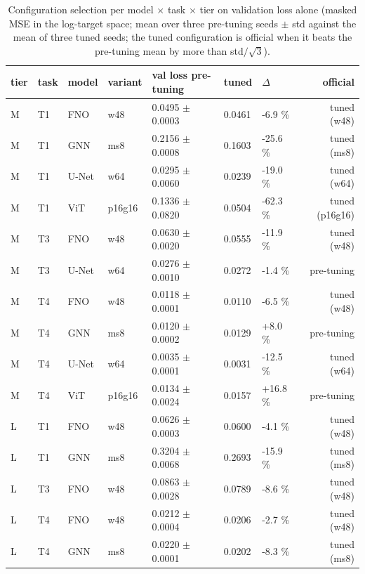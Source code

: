 \begin{table}[tb]
\centering
\scriptsize
\setlength{\tabcolsep}{3.5pt}
\caption{Configuration selection per model $\times$ task $\times$ tier on validation loss alone (masked MSE in the log-target space; mean over three pre-tuning seeds $\pm$ std against the mean of three tuned seeds; the tuned configuration is official when it beats the pre-tuning mean by more than std$/\sqrt{3}$).}
\label{tab:decisions}
\setlength{\tabcolsep}{2.2pt}
\begin{tabular}{lllllllr}
\toprule
tier & task & model & variant & val loss pre-tuning & tuned & $\Delta$ & official \\
\midrule
M & T1 & FNO & w48 & 0.0495 $\pm$ 0.0003 & 0.0461 & -6.9 \% & tuned (w48) \\
M & T1 & GNN & ms8 & 0.2156 $\pm$ 0.0008 & 0.1603 & -25.6 \% & tuned (ms8) \\
M & T1 & U-Net & w64 & 0.0295 $\pm$ 0.0060 & 0.0239 & -19.0 \% & tuned (w64) \\
M & T1 & ViT & p16g16 & 0.1336 $\pm$ 0.0820 & 0.0504 & -62.3 \% & tuned (p16g16) \\
M & T3 & FNO & w48 & 0.0630 $\pm$ 0.0020 & 0.0555 & -11.9 \% & tuned (w48) \\
M & T3 & U-Net & w64 & 0.0276 $\pm$ 0.0010 & 0.0272 & -1.4 \% & pre-tuning \\
M & T4 & FNO & w48 & 0.0118 $\pm$ 0.0001 & 0.0110 & -6.5 \% & tuned (w48) \\
M & T4 & GNN & ms8 & 0.0120 $\pm$ 0.0002 & 0.0129 & +8.0 \% & pre-tuning \\
M & T4 & U-Net & w64 & 0.0035 $\pm$ 0.0001 & 0.0031 & -12.5 \% & tuned (w64) \\
M & T4 & ViT & p16g16 & 0.0134 $\pm$ 0.0024 & 0.0157 & +16.8 \% & pre-tuning \\
L & T1 & FNO & w48 & 0.0626 $\pm$ 0.0003 & 0.0600 & -4.1 \% & tuned (w48) \\
L & T1 & GNN & ms8 & 0.3204 $\pm$ 0.0068 & 0.2693 & -15.9 \% & tuned (ms8) \\
L & T3 & FNO & w48 & 0.0863 $\pm$ 0.0028 & 0.0789 & -8.6 \% & tuned (w48) \\
L & T4 & FNO & w48 & 0.0212 $\pm$ 0.0004 & 0.0206 & -2.7 \% & tuned (w48) \\
L & T4 & GNN & ms8 & 0.0220 $\pm$ 0.0001 & 0.0202 & -8.3 \% & tuned (ms8) \\
\bottomrule
\end{tabular}
\end{table}
